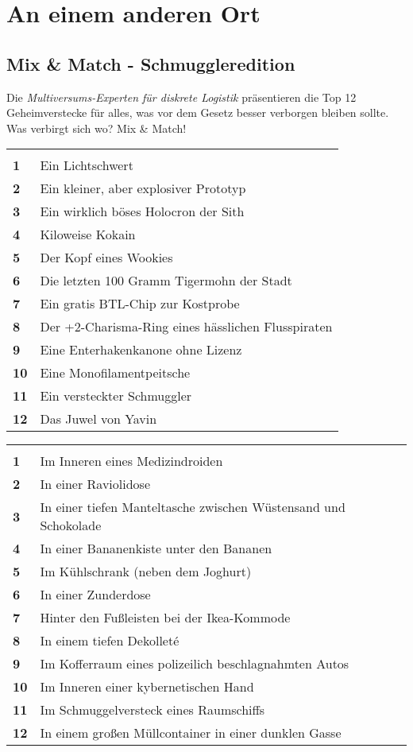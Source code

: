 \documentclass[final]{multiversum}
\begin{document}
\section{An einem anderen Ort}
\subsection{Mix \& Match - Schmuggleredition} 
Die \textit{Multiversums-Experten für diskrete Logistik} präsentieren die Top 12 Geheimverstecke für alles, was vor dem Gesetz besser verborgen bleiben sollte. Was verbirgt sich wo? Mix \& Match!

\begin{framed}
\centering
\begin{tabular}{>{\bfseries}p{}p{}}
\multicolumn{2}{c}{\textbf{1W12}}\\
    1 & Ein Lichtschwert \\
    2 & Ein kleiner, aber explosiver Prototyp \\
    3 & Ein wirklich böses Holocron der Sith \\
    4 & Kiloweise Kokain \\
    5 & Der Kopf eines Wookies \\
    6 & Die letzten 100 Gramm Tigermohn der Stadt \\
    7 & Ein gratis BTL-Chip zur Kostprobe \\
    8 & Der +2-Charisma-Ring eines hässlichen Flusspiraten \\
    9 & Eine Enterhakenkanone ohne Lizenz \\
    10 & Eine Monofilamentpeitsche \\
    11 & Ein versteckter Schmuggler \\
    12 & Das Juwel von Yavin \\
\end{tabular}
    \vspace{1em}

\begin{tabular}{>{\bfseries}p{}p{}}
\multicolumn{2}{c}{\textbf{1W12}}\\
    1 & Im Inneren eines Medizindroiden \\
    2 & In einer Raviolidose \\
    3 & In einer tiefen Manteltasche zwischen Wüstensand und Schokolade \\
    4 & In einer Bananenkiste unter den Bananen \\
    5 & Im Kühlschrank (neben dem Joghurt) \\
    6 & In einer Zunderdose \\
    7 & Hinter den Fußleisten bei der Ikea-Kommode \\
    8 & In einem tiefen Dekolleté \\
    9 & Im Kofferraum eines polizeilich beschlagnahmten Autos \\
    10 & Im Inneren einer kybernetischen Hand \\
    11 & Im Schmuggelversteck eines Raumschiffs \\
    12 & In einem großen Müllcontainer in einer dunklen Gasse \\
\end{tabular}
\end{framed}
\end{document}
